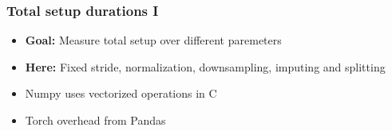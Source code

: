 \documentclass[t,english]{beamer}
\begin{document}
\begin{frame}
  \frametitle{Total setup durations I}
  \begin{itemize}
    \item<1-> \textbf{Goal:} Measure total setup over different paremeters
    \item<2-> \textbf{Here:} Fixed stride, normalization, downsampling, imputing and splitting
  \end{itemize}
  \begin{itemize}
    \item<4->  Numpy uses vectorized operations in C
    \item<5->Torch overhead from Pandas
  \end{itemize}
\end{frame}
\end{document}
